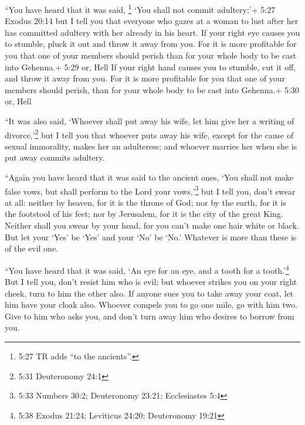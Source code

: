  ``You have heard that it was said, \footnote{5:27 TR adds
  ``to the ancients''.} `You shall not commit adultery;'+ 5:27 Exodus
20:14  but I tell you that everyone who gazes at a woman to
lust after her has committed adultery with her already in his heart.
 If your right eye causes you to stumble, pluck it out and
throw it away from you. For it is more profitable for you that one of
your members should perish than for your whole body to be cast into
Gehenna.+ 5:29 or, Hell  If your right hand causes you to
stumble, cut it off, and throw it away from you. For it is more
profitable for you that one of your members should perish, than for your
whole body to be cast into Gehenna.+ 5:30 or, Hell

 ``It was also said, `Whoever shall put away his wife, let
him give her a writing of divorce,'\footnote{5:31 Deuteronomy 24:1}
 but I tell you that whoever puts away his wife, except for
the cause of sexual immorality, makes her an adulteress; and whoever
marries her when she is put away commits adultery.

 ``Again you have heard that it was said to the ancient
ones, `You shall not make false vows, but shall perform to the Lord your
vows,'\footnote{5:33 Numbers 30:2; Deuteronomy 23:21; Ecclesiastes 5:4}
 but I tell you, don't swear at all: neither by heaven, for
it is the throne of God;  nor by the earth, for it is the
footstool of his feet; nor by Jerusalem, for it is the city of the great
King.  Neither shall you swear by your head, for you can't
make one hair white or black.  But let your `Yes' be `Yes'
and your `No' be `No.' Whatever is more than these is of the evil one.

 ``You have heard that it was said, `An eye for an eye, and
a tooth for a tooth.'\footnote{5:38 Exodus 21:24; Leviticus 24:20;
  Deuteronomy 19:21}  But I tell you, don't resist him who
is evil; but whoever strikes you on your right cheek, turn to him the
other also.  If anyone sues you to take away your coat, let
him have your cloak also.  Whoever compels you to go one
mile, go with him two.  Give to him who asks you, and don't
turn away him who desires to borrow from you.


